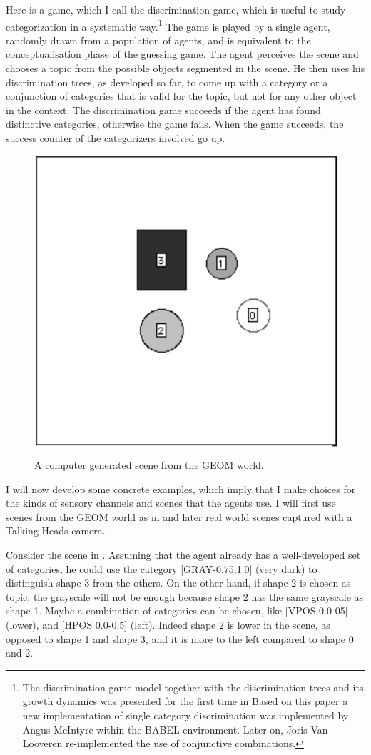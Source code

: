 Here is a game, which I call the discrimination game, which is useful 
to study categorization in 
a systematic way.\footnote{
The discrimination game model together with the 
discrimination trees and its growth dynamics 
was presented for the first time in \cite{Steels:1996}
Based on this paper a new implementation of
single category discrimination was implemented by Angus McIntyre 
within the BABEL environment. Later on, Joris Van Looveren
re-implemented the use of conjunctive combinations.}
The game is played by a single agent, randomly 
drawn from a population of agents, and 
is equivalent to the conceptualisation phase of 
the guessing game. The agent perceives the scene and 
chooses a topic from the possible objects segmented in the
scene. He then uses his discrimination trees, as developed so
far, to come up with a category or a conjunction
of categories that is valid for the topic, but not for any
other object in the context. The discrimination game succeeds if 
the agent has found distinctive categories, otherwise the game
fails. When the game succeeds, the success counter
of the categorizers involved go up. 
\begin{figure}[htbp]
  \centerline{\includegraphics[width=.40\textwidth]{chap4/figs/game5}}
\caption{\footnotesize \label{geom} A computer generated scene 
from the GEOM world.}
\end{figure}

I will now develop some concrete examples, which imply
that I make choices for the kinds of sensory channels
and scenes that the agents use. 
I will first use scenes from the GEOM world as in 
 and later real world scenes captured
with a Talking Heads camera. 

Consider the scene in . Assuming that the agent
already has a well-developed set of categories, he could use 
the category [GRAY-0.75,1.0] (very dark) to distinguish 
shape 3 from the others. On the other hand, if shape 2 is 
chosen as topic, the grayscale will not be enough because
shape 2 has the same grayscale as shape 1. Maybe a 
combination of categories can be chosen, like [VPOS 0.0-05]
(lower), and [HPOS 0.0-0.5] (left). Indeed shape 2
is lower in the scene, as opposed to
shape 1 and shape 3, and it is more to the left compared 
to shape 0 and 2.

